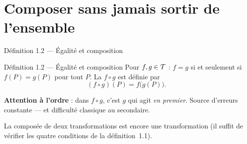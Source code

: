 \section{Composer sans jamais sortir de l'ensemble}

\begin{frame}{Définition 1.2 --- Égalité et composition}
  \begin{Enonce}{Définition 1.2 --- Égalité et composition}
    Pour $f,g \in \mathcal{T}$ : $f = g$ si et seulement si $f(P) = g(P)$
    pour tout $P$. La  $f \circ g$ est définie par
    \[
      (f \circ g)(P) = f\bigl(g(P)\bigr).
    \]
  \end{Enonce}
  \vspace{6pt}
  \textbf{Attention à l'ordre} : dans $f \circ g$, c'est $g$ qui agit
  \emph{en premier}. Source d'erreurs constante --- et difficulté
  classique au secondaire.
  \vspace{4pt}

  \small La composée de deux transformations est encore une
  transformation (il suffit de vérifier les quatre conditions de la
  définition~1.1).
\end{frame}

